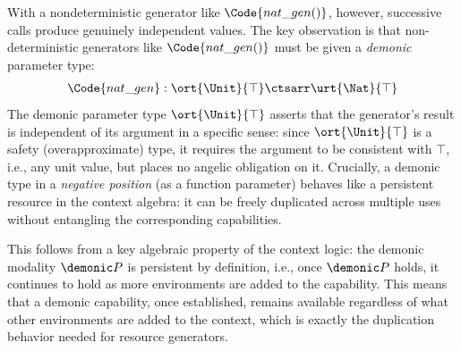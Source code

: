 With a nondeterministic generator like $\Code{nat\_gen()}$, however,
successive calls produce genuinely independent values.  The key
observation is that non-deterministic generators like
$\Code{nat\_gen()}$ must be given a \emph{demonic} parameter type:
\begin{align*}
  \Code{nat\_gen} : \ort{\Unit}{\top} \ctsarr \urt{\Nat}{\top}
\end{align*}
The demonic parameter type $\ort{\Unit}{\top}$ asserts that the
generator's result is independent of its argument in a specific sense:
since $\ort{\Unit}{\top}$ is a safety (overapproximate) type, it
requires the argument to be consistent with $\top$, i.e., any unit
value, but places no angelic obligation on it.  Crucially, a demonic
type in a \emph{negative position} (as a function parameter) behaves
like a persistent resource in the context algebra: it can be freely
duplicated across multiple uses without entangling the corresponding
capabilities.

This follows from a key algebraic property of the context logic: the
demonic modality $\demonic P$ is persistent by definition, i.e., once
$\demonic P$ holds, it continues to hold as more environments are
added to the capability. This means that a demonic capability, once
established, remains available regardless of what other environments
are added to the context, which is exactly the duplication behavior
needed for resource generators.


